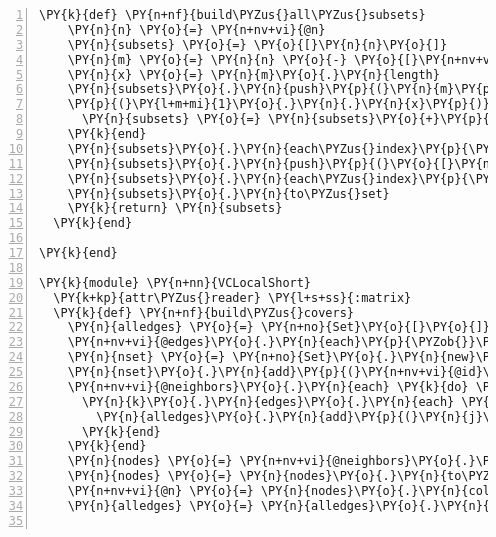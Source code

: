 \begin{Verbatim}[commandchars=\\\{\},numbers=left,firstnumber=1,stepnumber=1,xleftmargin=7mm, fontsize=\small]
  \PY{k}{def} \PY{n+nf}{build\PYZus{}all\PYZus{}subsets}
    \PY{n}{n} \PY{o}{=} \PY{n+nv+vi}{@n}
    \PY{n}{subsets} \PY{o}{=} \PY{o}{[}\PY{n}{n}\PY{o}{]}
    \PY{n}{m} \PY{o}{=} \PY{n}{n} \PY{o}{-} \PY{o}{[}\PY{n+nv+vi}{@id}\PY{o}{]}
    \PY{n}{x} \PY{o}{=} \PY{n}{m}\PY{o}{.}\PY{n}{length}
    \PY{n}{subsets}\PY{o}{.}\PY{n}{push}\PY{p}{(}\PY{n}{m}\PY{p}{)}
    \PY{p}{(}\PY{l+m+mi}{1}\PY{o}{.}\PY{n}{.}\PY{n}{x}\PY{p}{)}\PY{o}{.}\PY{n}{each} \PY{k}{do} \PY{o}{|}\PY{n}{k}\PY{o}{|}
      \PY{n}{subsets} \PY{o}{=} \PY{n}{subsets}\PY{o}{+}\PY{p}{(}\PY{n}{m}\PY{o}{.}\PY{n}{combination}\PY{p}{(}\PY{n}{k}\PY{p}{)}\PY{o}{.}\PY{n}{to\PYZus{}a}\PY{p}{)}
    \PY{k}{end}
    \PY{n}{subsets}\PY{o}{.}\PY{n}{each\PYZus{}index}\PY{p}{\PYZob{}}\PY{o}{|}\PY{n}{k}\PY{o}{|} \PY{k}{if} \PY{n}{k}\PY{o}{>}\PY{l+m+mi}{1} \PY{k}{then} \PY{n}{subsets}\PY{o}{[}\PY{n}{k}\PY{o}{]}\PY{o}{.}\PY{n}{push}\PY{p}{(}\PY{n+nv+vi}{@id}\PY{p}{)} \PY{k}{end}\PY{p}{\PYZcb{}}
    \PY{n}{subsets}\PY{o}{.}\PY{n}{push}\PY{p}{(}\PY{o}{[}\PY{n+nv+vi}{@id}\PY{o}{]}\PY{p}{)}
    \PY{n}{subsets}\PY{o}{.}\PY{n}{each\PYZus{}index}\PY{p}{\PYZob{}}\PY{o}{|}\PY{n}{k}\PY{o}{|} \PY{n}{subsets}\PY{o}{[}\PY{n}{k}\PY{o}{]} \PY{o}{=} \PY{n}{subsets}\PY{o}{[}\PY{n}{k}\PY{o}{]}\PY{o}{.}\PY{n}{to\PYZus{}set}\PY{p}{\PYZcb{}}
    \PY{n}{subsets}\PY{o}{.}\PY{n}{to\PYZus{}set}
    \PY{k}{return} \PY{n}{subsets}
  \PY{k}{end}

\PY{k}{end}

\PY{k}{module} \PY{n+nn}{VCLocalShort}
  \PY{k+kp}{attr\PYZus{}reader} \PY{l+s+ss}{:matrix}
  \PY{k}{def} \PY{n+nf}{build\PYZus{}covers}
    \PY{n}{alledges} \PY{o}{=} \PY{n+no}{Set}\PY{o}{[}\PY{o}{]}
    \PY{n+nv+vi}{@edges}\PY{o}{.}\PY{n}{each}\PY{p}{\PYZob{}}\PY{o}{|}\PY{n}{k}\PY{o}{|} \PY{n}{alledges}\PY{o}{.}\PY{n}{add}\PY{p}{(}\PY{n}{k}\PY{p}{)}\PY{p}{\PYZcb{}}
    \PY{n}{nset} \PY{o}{=} \PY{n+no}{Set}\PY{o}{.}\PY{n}{new}\PY{p}{(}\PY{n+nv+vi}{@neighbors}\PY{o}{.}\PY{n}{collect}\PY{p}{\PYZob{}}\PY{o}{|}\PY{n}{k}\PY{o}{|} \PY{n}{k}\PY{o}{.}\PY{n}{id}\PY{p}{\PYZcb{}}\PY{p}{)}
    \PY{n}{nset}\PY{o}{.}\PY{n}{add}\PY{p}{(}\PY{n+nv+vi}{@id}\PY{p}{)}
    \PY{n+nv+vi}{@neighbors}\PY{o}{.}\PY{n}{each} \PY{k}{do} \PY{o}{|}\PY{n}{k}\PY{o}{|} 
      \PY{n}{k}\PY{o}{.}\PY{n}{edges}\PY{o}{.}\PY{n}{each} \PY{k}{do} \PY{o}{|}\PY{n}{j}\PY{o}{|} 
        \PY{n}{alledges}\PY{o}{.}\PY{n}{add}\PY{p}{(}\PY{n}{j}\PY{p}{)} \PY{k}{if} \PY{n}{j}\PY{o}{.}\PY{n}{proper\PYZus{}subset?}\PY{p}{(}\PY{n}{nset}\PY{p}{)}
      \PY{k}{end}
    \PY{k}{end}
    \PY{n}{nodes} \PY{o}{=} \PY{n+nv+vi}{@neighbors}\PY{o}{.}\PY{n}{to\PYZus{}set}\PY{o}{.}\PY{n}{add}\PY{p}{(}\PY{n+nb}{self}\PY{p}{)}
    \PY{n}{nodes} \PY{o}{=} \PY{n}{nodes}\PY{o}{.}\PY{n}{to\PYZus{}a}
    \PY{n+nv+vi}{@n} \PY{o}{=} \PY{n}{nodes}\PY{o}{.}\PY{n}{collect}\PY{p}{\PYZob{}}\PY{o}{|}\PY{n}{k}\PY{o}{|} \PY{n}{k}\PY{o}{.}\PY{n}{id}\PY{p}{\PYZcb{}}
    \PY{n}{alledges} \PY{o}{=} \PY{n}{alledges}\PY{o}{.}\PY{n}{to\PYZus{}a}    
    

\end{Verbatim}
